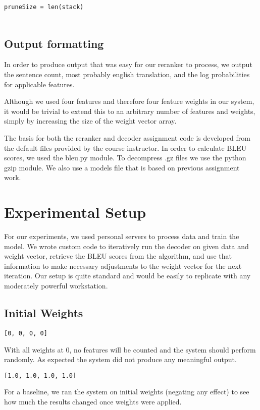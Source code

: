 \documentclass[11pt,letterpaper]{article}
\begin{document}
\texttt{\scriptsize{pruneSize = len(stack) }}
\\ \\
\subsection{Output formatting}

In order to produce output that was easy for our reranker to process, we output the sentence count, most probably english translation, and the log probabilities for applicable features. 

Although we used four features and therefore four feature weights in our system, it would be trivial to extend this to an arbitrary number of features and weights, simply by increasing the size of the weight vector array.

The basis for both the reranker and decoder assignment code is developed from the default files provided by the course instructor. In order to calculate BLEU scores, we used the bleu.py module. To decompress .gz files we use the python gzip module. We also use a models file that is based on previous assignment work.

\section{Experimental Setup}
For our experiments, we used personal servers to process data and train the model. We wrote custom code to iteratively run the decoder on given data and weight vector, retrieve the BLEU scores from the algorithm, and use that information to make necessary adjustments to the weight vector for the next iteration. Our setup is quite standard and would be easily to replicate with any moderately powerful workstation.

\subsection{Initial Weights}

\noindent\texttt{[0, 0, 0, 0]}

With all weights at 0, no features will be counted and the system should perform randomly. As expected the system did not produce any meaningful output.

\noindent\texttt{[1.0, 1.0, 1.0, 1.0]}

For a baseline, we ran the system on initial weights (negating any effect) to see how much the results changed once weights were applied.
\end{document}
